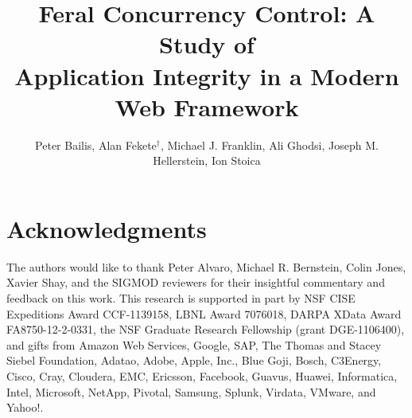 \documentclass{sig-alternate}
\theoremstyle{definition}
\begin{document}
%

\title{Feral Concurrency Control: A Study of\\Application Integrity in
  a Modern Web Framework}

{\author{Peter Bailis, Alan Fekete{\fontsize{12}{14}$^\dagger$},
    Michael J. Franklin, Ali Ghodsi, Joseph M. Hellerstein, Ion Stoica
    \\{}}}
\maketitle



















\section*{Acknowledgments}

The authors would like to thank Peter Alvaro, Michael R. Bernstein,
Colin Jones, Xavier Shay, and the SIGMOD reviewers for their
insightful commentary and feedback on this work. This research is
supported in part by NSF CISE Expeditions Award CCF-1139158, LBNL
Award 7076018, DARPA XData Award FA8750-12-2-0331, the NSF Graduate
Research Fellowship (grant DGE-1106400), and gifts from Amazon Web
Services, Google, SAP, The Thomas and Stacey Siebel Foundation,
Adatao, Adobe, Apple, Inc., Blue Goji, Bosch, C3Energy, Cisco, Cray,
Cloudera, EMC, Ericsson, Facebook, Guavus, Huawei, Informatica, Intel,
Microsoft, NetApp, Pivotal, Samsung, Splunk, Virdata, VMware, and
Yahoo!.

\scriptsize
\linespread{.98}
\selectfont

 

\linespread{1}
\normalsize
\selectfont



\balance
\end{document}
